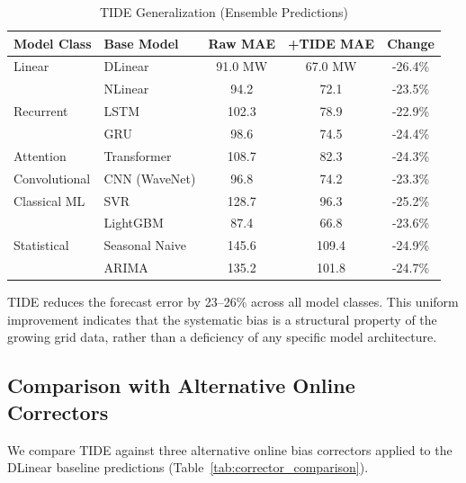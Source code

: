 \documentclass[11pt,letterpaper]{article}
\begin{document}
\begin{table}[h]
\centering
\small
\setlength{\tabcolsep}{4pt}
\caption{TIDE Generalization (Ensemble Predictions)}
\label{tab:generalization}
\begin{tabular}{@{}llccc@{}}
\toprule
\textbf{Model Class} & \textbf{Base Model} & \textbf{Raw MAE} & \textbf{+TIDE MAE} & \textbf{Change} \\ \midrule
Linear & DLinear~\cite{zeng2023transformers} & 91.0 MW & 67.0 MW & -26.4\% \\
 & NLinear~\cite{zeng2023transformers} & 94.2 & 72.1 & -23.5\% \\ \midrule
Recurrent & LSTM~\cite{khodayar2019rough} & 102.3 & 78.9 & -22.9\% \\
 & GRU & 98.6 & 74.5 & -24.4\% \\ \midrule
Attention & Transformer~\cite{zhou2021informer} & 108.7 & 82.3 & -24.3\% \\ \midrule
Convolutional & CNN (WaveNet) & 96.8 & 74.2 & -23.3\% \\ \midrule
Classical ML & SVR & 128.7 & 96.3 & -25.2\% \\
 & LightGBM & 87.4 & 66.8 & -23.6\% \\ \midrule
Statistical & Seasonal Naive & 145.6 & 109.4 & -24.9\% \\
 & ARIMA~\cite{box2015time} & 135.2 & 101.8 & -24.7\% \\ \bottomrule
\end{tabular}
\end{table}

TIDE reduces the forecast error by 23--26\% across all model classes. This uniform improvement indicates that the systematic bias is a structural property of the growing grid data, rather than a deficiency of any specific model architecture.

\subsection{Comparison with Alternative Online Correctors}
We compare TIDE against three alternative online bias correctors applied to the DLinear baseline predictions (Table~\ref{tab:corrector_comparison}).
\end{document}
